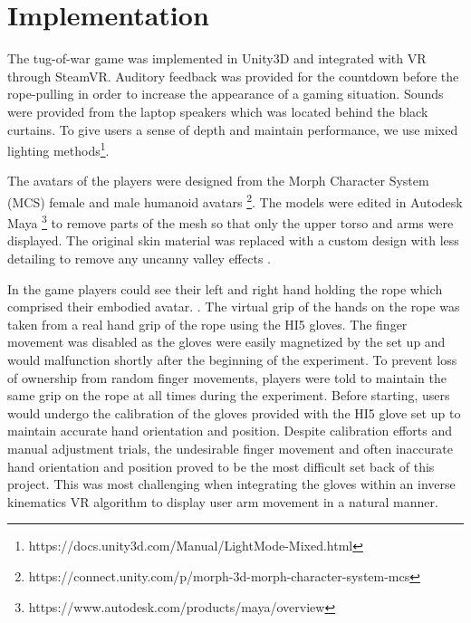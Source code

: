 
\section{Implementation}
The tug-of-war game was implemented in Unity3D and integrated with VR through SteamVR. Auditory feedback was provided for the countdown before the rope-pulling in order to increase the appearance of a gaming situation. Sounds were provided from the laptop speakers which was located behind the black curtains. 
To give users a sense of depth and maintain performance, we use mixed lighting methods\footnote{https://docs.unity3d.com/Manual/LightMode-Mixed.html}.

The avatars of the players were designed from the Morph Character System (MCS) female and male humanoid avatars  \footnote{https://connect.unity.com/p/morph-3d-morph-character-system-mcs}. The models were edited in Autodesk Maya \footnote{https://www.autodesk.com/products/maya/overview} to remove parts of the mesh so that only the upper torso and arms were displayed. The original skin material was replaced with a custom design with less detailing to remove any uncanny valley effects \cite{geller2008overcoming}. 

In the game players could see their left and right hand holding the rope which comprised their embodied avatar. . The virtual grip of the hands on the rope was taken from a real hand grip of the rope using the HI5 gloves. The finger movement was disabled as the gloves were easily magnetized by the set up and would malfunction shortly after the beginning of the experiment. To prevent loss of ownership from random finger movements, players were told to maintain the same grip on the rope at all times during the experiment. Before starting, users would undergo the calibration of the gloves provided with the HI5 glove set up to maintain accurate hand orientation and position. Despite calibration efforts and manual adjustment trials, the  undesirable finger movement and often inaccurate hand orientation and position proved to be the most difficult set back of this project. This was most challenging when integrating the gloves within an inverse kinematics VR algorithm to display user arm movement in a natural manner.

